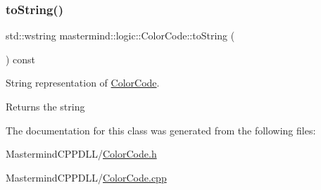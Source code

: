\subsubsection{\texorpdfstring{to\+String()}{toString()}\hspace{0.1cm}{\footnotesize\ttfamily [2/2]}}
{\footnotesize\ttfamily std\+::wstring mastermind\+::logic\+::\+Color\+Code\+::to\+String (\begin{DoxyParamCaption}{ }\end{DoxyParamCaption}) const\hspace{0.3cm}{\ttfamily [virtual]}}



String representation of \hyperlink{classmastermind_1_1logic_1_1_color_code}{Color\+Code}. 

\begin{DoxyReturn}{Returns}
the string 
\end{DoxyReturn}


The documentation for this class was generated from the following files\+:\begin{DoxyCompactItemize}
\item 
Mastermind\+C\+P\+P\+D\+L\+L/\hyperlink{_color_code_8h}{Color\+Code.\+h}\item 
Mastermind\+C\+P\+P\+D\+L\+L/\hyperlink{_color_code_8cpp}{Color\+Code.\+cpp}\end{DoxyCompactItemize}
